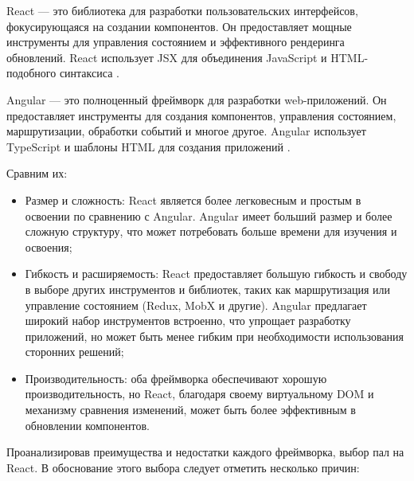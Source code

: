 React — это библиотека для разработки пользовательских интерфейсов, фокусирующаяся на создании компонентов. Он предоставляет мощные инструменты для управления состоянием и эффективного рендеринга обновлений. React использует JSX для объединения JavaScript и HTML-подобного синтаксиса \cite{React}.

Angular — это полноценный фреймворк для разработки web-приложений. Он предоставляет инструменты для создания компонентов, управления состоянием, маршрутизации, обработки событий и многое другое. Angular использует TypeScript и шаблоны HTML для создания приложений \cite{Angular}.

Сравним их:

\begin{itemize}
    \item Размер и сложность: React является более легковесным и простым в освоении по сравнению с Angular. Angular имеет больший размер и более сложную структуру, что может потребовать больше времени для изучения и освоения;
    \item Гибкость и расширяемость: React предоставляет большую гибкость и свободу в выборе других инструментов и библиотек, таких как маршрутизация или управление состоянием (Redux, MobX и другие). Angular предлагает широкий набор инструментов встроенно, что упрощает разработку приложений, но может быть менее гибким при необходимости использования сторонних решений;
    \item Производительность: оба фреймворка обеспечивают хорошую производительность, но React, благодаря своему виртуальному DOM и механизму сравнения изменений, может быть более эффективным в обновлении компонентов.
\end{itemize}

Проанализировав преимущества и недостатки каждого фреймворка, выбор пал на React. В обоснование этого выбора следует отметить несколько причин:

